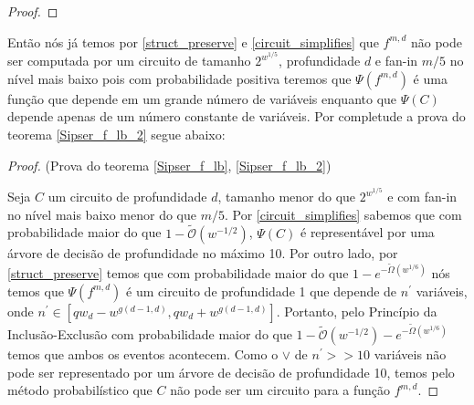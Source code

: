 \begin{proof}


\end{proof}

Então nós já temos por \ref{struct_preserve} e \ref{circuit_simplifies} que $f^{m, d}$ não pode ser computada por um circuito de tamanho $2^{w^{1/5}}$, profundidade $d$ e fan-in $m/5$ no nível mais baixo pois com probabilidade positiva teremos que $\Psi(f^{m, d})$ é uma função que depende em um grande número de variáveis enquanto que $\Psi(C)$ depende apenas de um número constante de variáveis. Por completude a prova do teorema \ref{Sipser_f_lb_2} segue abaixo:

\begin{proof} (Prova do teorema \ref{Sipser_f_lb}, \ref{Sipser_f_lb_2})

Seja $C$ um circuito de profundidade $d$, tamanho menor do que $2^{w^{1/5}}$ e com fan-in no nível mais baixo menor do que $m/5$. Por \ref{circuit_simplifies} sabemos que com probabilidade maior do que $1 - \widetilde{\mathcal{O}}(w^{-1/2})$, $\Psi(C)$ é representável por uma árvore de decisão de profundidade no máximo 10. Por outro lado, por \ref{struct_preserve} temos que com probabilidade maior do que $1 - e^{-\widetilde{\Omega}(w^{1/6})}$ nós temos que $\Psi(f^{m, d})$ é um circuito de profundidade 1 que depende de $n^{\prime}
$ variáveis, onde $n^{\prime} \in [qw_{d} - w^{g(d - 1, d)}, qw_{d} + w^{g(d - 1, d)}]$. Portanto, pelo Princípio da Inclusão-Exclusão com probabilidade maior do que $1 - \widetilde{\mathcal{O}}(w^{-1/2}) - e^{-\widetilde{\Omega}(w^{1/6})}$ temos que ambos os eventos acontecem. Como o $\lor$ de $n^{\prime} >> 10$ variáveis não pode ser representado por um árvore de decisão de profundidade 10, temos pelo método probabilístico que $C$ não pode ser um circuito para a função $f^{m, d}$.

\end{proof}

